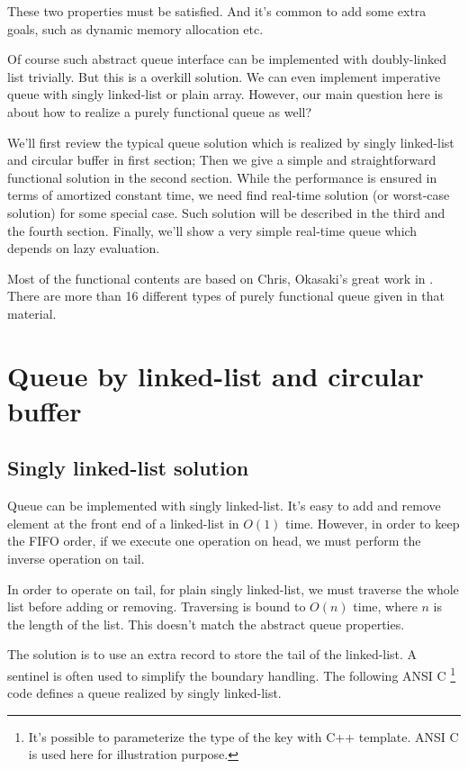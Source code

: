 \documentclass{article}
\begin{document}
These two properties must be satisfied. And it's common to add some extra
goals, such as dynamic memory allocation etc.

Of course such abstract queue interface can be implemented with
doubly-linked list trivially. But this is a overkill solution.
We can even implement imperative queue with singly linked-list or
plain array. However, our main question here is about how to realize
a purely functional queue as well?

We'll first review the typical queue solution which is realized by
singly linked-list and circular buffer in first section; Then we
give a simple and straightforward functional solution in the second
section. While the performance is ensured in terms of amortized
constant time, we need find real-time solution (or worst-case solution)
for some special case. Such solution will be described in the third
and the fourth section. Finally, we'll show a very simple real-time
queue which depends on lazy evaluation.

Most of the functional contents are based on Chris, Okasaki's great
work in \cite{okasaki-book}. There are more than 16 different types
of purely functional queue given in that material.

\section{Queue by linked-list and circular buffer}

\subsection{Singly linked-list solution}

Queue can be implemented with singly linked-list. It's easy to add
and remove element at the front end of a linked-list in $O(1)$ time.
However, in
order to keep the FIFO order, if we execute one operation on head,
we must perform the inverse operation on tail.

In order to operate on tail, for plain singly linked-list, we must traverse the whole list before
adding or removing. Traversing is bound to $O(n)$ time,
where $n$ is the length of the list. This doesn't match the abstract
queue properties.

The solution is to use an extra record to store the tail of the linked-list.
A sentinel is often used to simplify the boundary handling. The
following ANSI C \footnote{It's possible to parameterize the type of the key
with C++ template. ANSI C is used here for illustration purpose.}
code defines a queue realized by singly linked-list.
\end{document}

